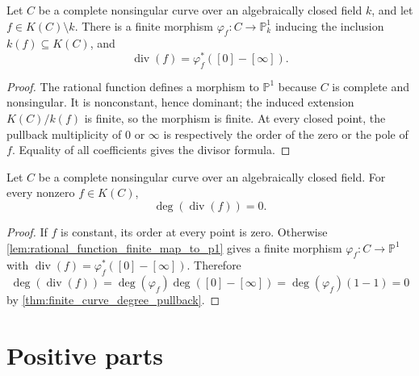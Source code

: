 \begin{lemma}
  \label{lem:rational_function_finite_map_to_p1}

  Let \(C\) be a complete nonsingular curve over an algebraically closed field
  \(k\), and let
  \(f\in K(C)\setminus k\).  There is a finite morphism
  \(\varphi_f\colon C\to\mathbb P^1_k\) inducing the inclusion
  \(k(f)\subseteq K(C)\), and
  \[
    \operatorname{div}(f)
      =\varphi_f^*([0]-[\infty]).
  \]
\end{lemma}
\begin{proof}
  The rational function defines a morphism to \(\mathbb P^1\) because \(C\)
  is complete and nonsingular.  It is nonconstant, hence dominant; the
  induced extension \(K(C)/k(f)\) is finite, so the morphism is finite.
  At every closed point, the pullback multiplicity of \(0\) or \(\infty\)
  is respectively the order of the zero or the pole of \(f\).  Equality of
  all coefficients gives the divisor formula.
\end{proof}

\begin{theorem}
  \label{thm:principal_deg_zero}
  \notready

  Let \(C\) be a complete nonsingular curve over an algebraically closed
  field.  For every nonzero \(f\in K(C)\),
  \[
    \deg(\operatorname{div}(f))=0.
  \]
\end{theorem}
\begin{proof}
  If \(f\) is constant, its order at every point is zero.  Otherwise
  \cref{lem:rational_function_finite_map_to_p1} gives a finite morphism
  \(\varphi_f\colon C\to\mathbb P^1\) with
  \(\operatorname{div}(f)=\varphi_f^*([0]-[\infty])\).  Therefore
  \[
    \deg(\operatorname{div}(f))
      =\deg(\varphi_f)\deg([0]-[\infty])
      =\deg(\varphi_f)(1-1)=0
  \]
  by \cref{thm:finite_curve_degree_pullback}.
\end{proof}

\section{Positive parts}

